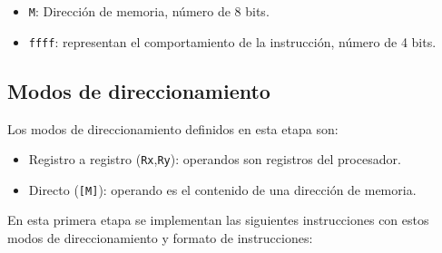 \documentclass[12pt,oneside]{templates/unerthesis}
\providecommand{\tightlist}{%
  \setlength{\itemsep}{0pt}\setlength{\parskip}{0pt}}
\begin{document}
\begin{itemize}
\item
  \texttt{M}: Dirección de memoria, número de 8 bits.
\item
  \texttt{ffff}: representan el comportamiento de la instrucción, número de 4 bits.
\end{itemize}

\hypertarget{modos-de-direccionamiento-1}{%
\subsection{Modos de direccionamiento}\label{modos-de-direccionamiento-1}}

Los modos de direccionamiento definidos en esta etapa son:

\begin{itemize}
\tightlist
\item
  Registro a registro (\texttt{Rx},\texttt{Ry}): operandos son registros del procesador.
\item
  Directo (\texttt{{[}M{]}}): operando es el contenido de una dirección de memoria.
\end{itemize}

En esta primera etapa se implementan las siguientes instrucciones con estos modos de direccionamiento y formato de instrucciones:
\end{document}
